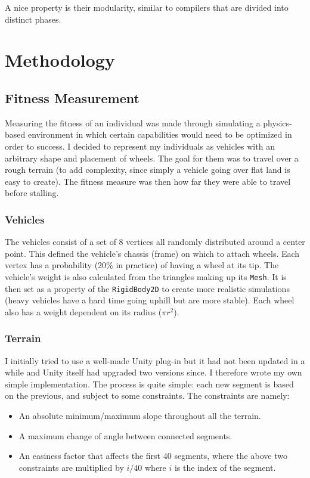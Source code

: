\documentclass[12pt,Bold,letterpaper,TexShade]{mcgilletdclass}
\begin{document}
A nice property is their modularity, similar to compilers that are divided into distinct phases.

\section{Methodology}

\subsection{Fitness Measurement}

Measuring the fitness of an individual was made through simulating a physics-based environment in which certain capabilities would need to be optimized in order to success. I decided to represent my individuals as vehicles with an arbitrary shape and placement of wheels. The goal for them was to travel over a rough terrain (to add complexity, since simply a vehicle going over flat land is easy to create). The fitness measure was then how far they were able to travel before stalling.

\subsubsection{Vehicles}

The vehicles consist of a set of 8 vertices all randomly distributed around a center point. This defined the vehicle's chassis (frame) on which to attach wheels. Each vertex has a probability (20\% in practice) of having a wheel at its tip. The vehicle's weight is also calculated from the triangles making up its \verb|Mesh|. It is then set as a property of the \verb|RigidBody2D| to create more realistic simulations (heavy vehicles have a hard time going uphill but are more stable). Each wheel also has a weight dependent on its radius ($\pi r^2$).

\subsubsection{Terrain}

I initially tried to use a well-made Unity plug-in but it had not been updated in a while and Unity itself had upgraded two versions since. I therefore wrote my own simple implementation. The process is quite simple: each new segment is based on the previous, and subject to some constraints. The constraints are namely:

\begin{itemize}
\item An absolute minimum/maximum slope throughout all the terrain.
\item A maximum change of angle between connected segments.
\item An easiness factor that affects the first 40 segments, where the above two constraints are multiplied by $i/40$ where $i$ is the index of the segment.
\end{itemize}
\end{document}
